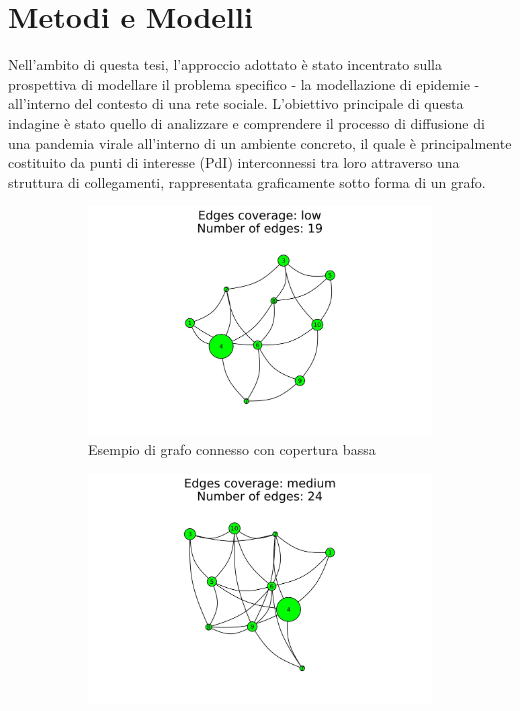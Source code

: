\section{Metodi e Modelli}

Nell'ambito di questa tesi, l'approccio adottato è stato incentrato 
sulla prospettiva di modellare il problema specifico - la modellazione di epidemie - all'interno del 
contesto di una rete sociale. L'obiettivo principale di questa indagine 
è stato quello di analizzare e comprendere il processo di diffusione di 
una pandemia virale all'interno di un ambiente concreto, il quale è 
principalmente costituito da punti di interesse (PdI) interconnessi tra 
loro attraverso una struttura di collegamenti, rappresentata graficamente 
sotto forma di un grafo. 

\begin{figure}[H]
	\centering
	\begin{subfigure}[b]{0.3\textwidth}
		\centering
		\includegraphics[width=\textwidth]{img/low.jpg}
		\caption{Esempio di grafo connesso con copertura bassa}
		\label{fig:connected_graph_example_low}
	\end{subfigure}
	\hfill
	\begin{subfigure}[b]{0.3\textwidth}
		\centering
		\includegraphics[width=\textwidth]{img/medium.jpg}

\end{subfigure}
\end{figure}
